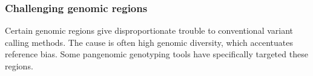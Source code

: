%

\subsubsection{Challenging genomic regions}


Certain genomic regions give disproportionate trouble to conventional variant calling methods. 
The cause is often high genomic diversity, which accentuates reference bias. 
Some pangenomic genotyping tools have specifically targeted these regions.

